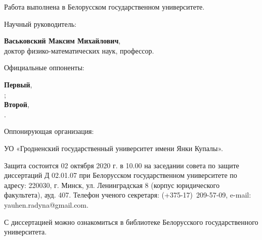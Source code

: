 \documentclass[_00_autoref.tex]{subfiles}
\begin{document}
\pagestyle{empty}
\setlength{\voffset}{-18mm}
\noindent Работа выполнена в Белорусском государственном университете.

\noindent
\begin{minipage}[t]{0.38\textwidth}
  \begin{flushleft}
    Научный руководитель:
  \end{flushleft}
\end{minipage}
\begin{minipage}[t]{0.61\textwidth}
  \begin{flushleft}
    \textbf{Васьковский Максим Михайлович},\\
    доктор физико-математических наук, профессор.
  \end{flushleft}
\end{minipage}

\medskip
\noindent
\begin{minipage}[t]{0.38\textwidth}
    \begin{flushleft}
        Официальные оппоненты:
    \end{flushleft}
\end{minipage}
\begin{minipage}[t]{0.61\textwidth}
    \begin{flushleft}
        \textbf{Первый},\\
        ;\\

        \textbf{Второй},\\
        .\\
\medskip
  \end{flushleft}
\end{minipage}

\medskip
\noindent
\begin{minipage}[t]{0.38\textwidth}
    \begin{flushleft}
        Оппонирующая организация:
    \end{flushleft}
\end{minipage}
\begin{minipage}[t]{0.61\textwidth}
    \begin{flushleft}
        УО «Гродненский государственный университет имени Янки Купалы».
    \medskip
  \end{flushleft}
\end{minipage}


{

Защита состоится 02 октября 2020 г. в 10.00 на заседании совета
по защите диссертаций Д 02.01.07 при Белорусском государственном университете
по адресу: 220030, г. Минск, ул. Ленинградская 8 (корпус юридического факультета),
ауд. 407. Телефон ученого секретаря: (+375-17)~209-57-09, e-mail: yauhen.radyna@gmail.com. 

С диссертацией можно ознакомиться в библиотеке
Белорусского государственного университета.
}
\end{document}
